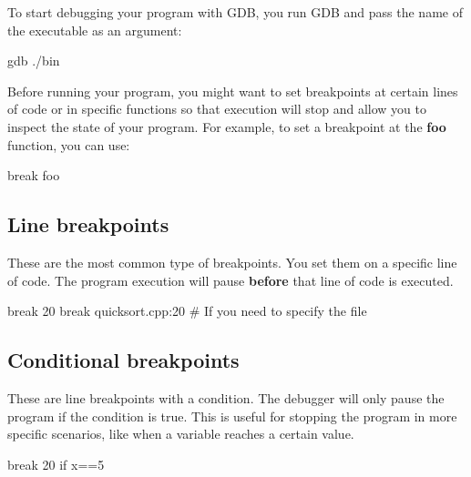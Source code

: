 \documentclass{report}
\begin{document}
    \bigbreak \noindent 
    \bigbreak \noindent 
    To start debugging your program with GDB, you run GDB and pass the name of the executable as an argument:
    \bigbreak \noindent 
    \begin{bashcode}
    gdb ./bin
    \end{bashcode}
    \bigbreak \noindent 
    \bigbreak \noindent 
    Before running your program, you might want to set breakpoints at certain lines of code or in specific functions so that execution will stop and allow you to inspect the state of your program. For example, to set a breakpoint at the \textbf{foo} function, you can use:
    \bigbreak \noindent 
    \begin{bashcode}
    break foo
    \end{bashcode}
    \bigbreak \noindent 
    \bigbreak \noindent 
    \subsection{Line breakpoints}
    \bigbreak \noindent 
    These are the most common type of breakpoints. You set them on a specific line of code. The program execution will pause \textbf{before} that line of code is executed.
    \bigbreak \noindent 
    \begin{bashcode}
    break 20
    break quicksort.cpp:20 # If you need to specify the file
    \end{bashcode}

    \bigbreak \noindent 
    \subsection{Conditional breakpoints}
    \bigbreak \noindent 
     These are line breakpoints with a condition. The debugger will only pause the program if the condition is true. This is useful for stopping the program in more specific scenarios, like when a variable reaches a certain value.
     \bigbreak \noindent 
     \begin{bashcode}
     break 20 if x==5
     \end{bashcode}
\end{document}
